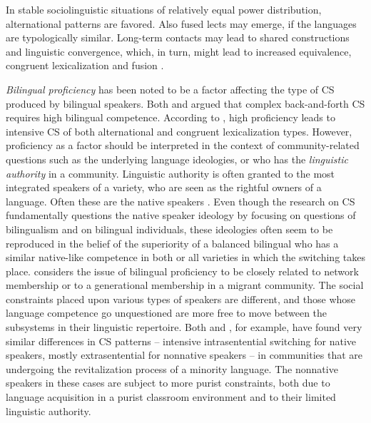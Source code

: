 \documentclass[output=paper,
modfonts
]{langscibook}
\begin{document}
In stable sociolinguistic situations of relatively equal power distribution, alternational patterns are favored. Also fused lects may emerge, if the languages are typologically similar. Long-term contacts may lead to shared constructions and linguistic convergence, which, in turn, might lead to increased equivalence, congruent lexicalization and fusion \parencite{auer1999codeswitching,muysken2000,muysken2013language}. 

\textit{Bilingual proficiency} has been noted to be a factor affecting the type of CS produced by bilingual speakers. Both \cite{poplack1980sometimes} and \cite{nortier1990dutch} argued that complex back-and-forth CS requires high bilingual competence. According to \cite{muysken2000}, high proficiency leads to intensive CS of both alternational and congruent lexicalization types. However, proficiency as a factor should be interpreted in the context of community-related questions such as the underlying language ideologies, or who has the \textit{linguistic authority} in a community. Linguistic authority is often granted to the most integrated speakers of a variety, who are seen as the rightful owners of a language. Often these are the native speakers \cite{doerr2009native}.  Even though the research on CS fundamentally questions the native speaker ideology by focusing on questions of bilingualism and on bilingual individuals, these ideologies often seem to be reproduced in the belief of the superiority of a balanced bilingual who has a similar native-like competence in both or all varieties in which the switching takes place. \cite[pp. 227]{muysken2000} considers the issue of bilingual proficiency to be closely related to network membership or to a generational membership in a migrant community. The social constraints placed upon various types of speakers are different, and those whose language competence go unquestioned are more free to move between the subsystems in their linguistic repertoire.  Both \cite{smith2016regression} and \cite{lantto2018new}, for example, have found very similar differences in CS patterns – intensive intrasentential switching for native speakers, mostly extrasentential for nonnative speakers – in communities that are undergoing the revitalization process of a minority language. The nonnative speakers in these cases are subject to more purist constraints, both due to language acquisition in a purist classroom environment and to their limited linguistic authority. 
\end{document}

